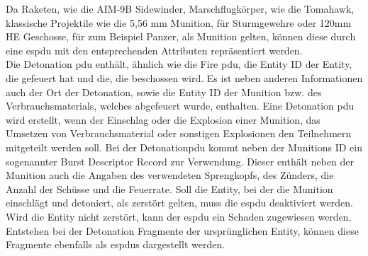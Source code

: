 Da Raketen, wie die AIM-9B Sidewinder, Marschflugkörper, wie die Tomahawk,   klassische Projektile wie die 5,56 mm Munition, für Sturmgewehre oder 120mm HE Geschosse, für zum Beispiel Panzer, als Munition gelten, können diese durch eine  \ac{espdu} mit den entsprechenden Attributen repräsentiert werden. 
\\
Die Detonation \ac{pdu} enthält, ähnlich wie die Fire \ac{pdu},  die Entity ID der Entity, die gefeuert hat und die, die beschossen wird. Es ist neben anderen Informationen auch der Ort der Detonation, sowie die Entity ID der Munition bzw. des Verbrauchsmaterials, welches abgefeuert wurde, enthalten. Eine Detonation \ac{pdu} wird erstellt, wenn der Einschlag oder die Explosion einer  Munition, das Umsetzen von Verbrauchsmaterial  oder sonstigen Explosionen den Teilnehmern mitgeteilt werden soll. 
Bei der Detonation\ac{pdu} kommt neben der Munitions ID ein sogenannter \glqq Burst Descriptor Record \grqq zur Verwendung. Dieser enthält neben der Munition auch die Angaben des verwendeten Sprengkopfs, des Zünders, die Anzahl der Schüsse und die Feuerrate.
Soll die Entity, bei der die Munition einschlägt und detoniert, als zerstört gelten, muss die  \ac{espdu} deaktiviert werden. Wird die Entity nicht zerstört, kann der  \ac{espdu} ein Schaden zugewiesen werden. Entstehen bei der Detonation Fragmente der ursprünglichen Entity, können diese Fragmente ebenfalls als  \acp{espdu} dargestellt werden.
\\
\cite{MarkMcCall.}
\cite{SISOStandardsActivityCommitteeoftheIEEEComputerSociety.}
\cite{Brann.}
\cite{JDBEatFt.HuachucaArizona.13.10.2003}
